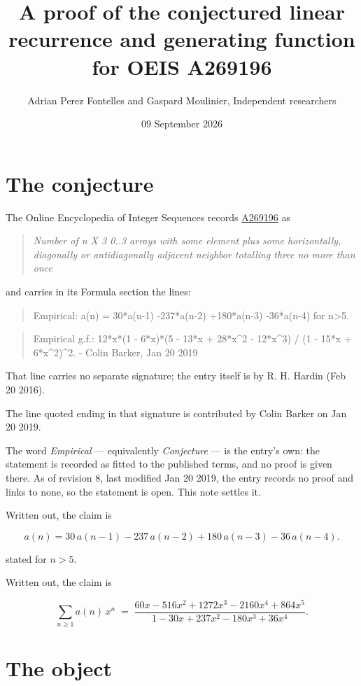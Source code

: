 \documentclass[11pt]{article}
\title{A proof of the conjectured linear recurrence and generating function for OEIS A269196}
\author{Adrian Perez Fontelles and Gaspard Moulinier, Independent researchers}
\date{09 September 2026}
\theoremstyle{definition}
\begin{document}
\maketitle
\section{The conjecture}

The Online Encyclopedia of Integer Sequences records \href{https://oeis.org/A269196}{A269196} as

\begin{quote}\itshape Number of n X 3 0..3 arrays with some element plus some horizontally, diagonally or antidiagonally adjacent neighbor totalling three no more than once\end{quote}

and carries in its Formula section the lines:

\begin{quote}\ttfamily Empirical: a(n) = 30*a(n-1) -237*a(n-2) +180*a(n-3) -36*a(n-4) for n>5.\end{quote}

\begin{quote}\ttfamily Empirical g.f.: 12*x*(1 - 6*x)*(5 - 13*x + 28*x\textasciicircum{}2 - 12*x\textasciicircum{}3) / (1 - 15*x + 6*x\textasciicircum{}2)\textasciicircum{}2. - Colin Barker, Jan 20 2019\end{quote}

That line carries no separate signature; the entry itself is by R. H. Hardin (Feb 20 2016).

The line quoted ending in that signature is contributed by Colin Barker on Jan 20 2019.

The word {\itshape Empirical} --- equivalently {\itshape Conjecture} --- is the entry's own: the statement is recorded as fitted to the published terms, and no proof is given there. As of revision 8, last modified Jan 20 2019, the entry records no proof and links to none, so the statement is open. This note settles it.

Written out, the claim is

\[a(n) = 30\,a(n-1) - 237\,a(n-2) + 180\,a(n-3) - 36\,a(n-4).\]

stated for $n > 5$.

Written out, the claim is

\[\sum_{n \ge 1} a(n)\,x^n \;=\; \frac{60x - 516x^{2} + 1272x^{3} - 2160x^{4} + 864x^{5}}{1 - 30x + 237x^{2} - 180x^{3} + 36x^{4}}.\]

\section{The object}
\end{document}

